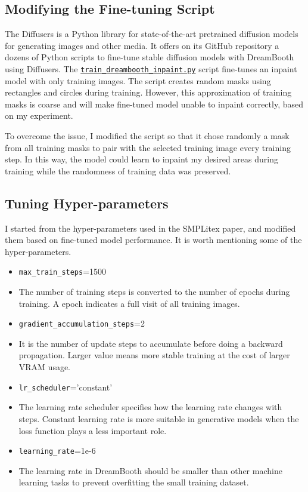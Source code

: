 \documentclass[acmtog]{acmart}
\begin{document}
\subsection{Modifying the Fine-tuning Script}

The Diffusers \cite{von-platen-etal-2022-diffusers} is a Python library for state-of-the-art pretrained diffusion models for generating images and other media. It offers on its GitHub repository a dozens of Python scripts to fine-tune stable diffusion models with DreamBooth using Diffusers. The \href{https://github.com/huggingface/diffusers/blob/main/examples/research\_projects/dreambooth\_inpaint/train\_dreambooth\_inpaint.py}{\texttt{train\_dreambooth\_inpaint.py}} script fine-tunes an inpaint model with only training images. The script creates random masks using rectangles and circles during training. However, this approximation of training masks is coarse and will make fine-tuned model unable to inpaint correctly, based on my experiment.

To overcome the issue, I modified the script so that it chose randomly a mask from all training masks to pair with the selected training image every training step. In this way, the model could learn to inpaint my desired areas during training while the randomness of training data was preserved.

\subsection{Tuning Hyper-parameters}

I started from the hyper-parameters used in the SMPLitex paper, and modified them based on fine-tuned model performance. It is worth mentioning some of the hyper-parameters.

\begin{itemize}
  \item \texttt{max\_train\_steps}=1500
  \item[] The number of training steps is converted to the number of epochs during training. A epoch indicates a full visit of all training images.
  \item \texttt{gradient\_accumulation\_steps}=2
  \item[] It is the number of update steps to accumulate before doing a backward propagation. Larger value means more stable training at the cost of larger VRAM usage.
  \item \texttt{lr\_scheduler}='constant'
  \item[] The learning rate scheduler specifies how the learning rate changes with steps. Constant learning rate is more suitable in generative models when the loss function plays a less important role.
  \item \texttt{learning\_rate}=1e-6
  \item[] The learning rate in DreamBooth should be smaller than other machine learning tasks to prevent overfitting the small training dataset.
\end{itemize}
\end{document}
